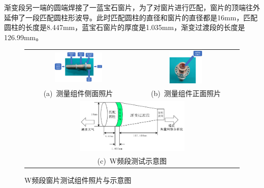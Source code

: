 \documentclass[master]{thesis-uestc}
\begin{document}
渐变段另一端的圆端焊接了一蓝宝石窗片，为了对窗片进行匹配，窗片的顶端往外延伸了一段匹配圆柱形波导。此时匹配圆柱的直径和窗片的直径都是16mm，匹配圆柱的长度是8.447mm，蓝宝石窗片的厚度是1.035mm，渐变过渡段的长度是126.99mm。
\begin{figure}[!htbp]
    \small
    \centering
    \begin{tabular}{@{\ }c@{\ }c}
        \includegraphics[width=0.47\textwidth]{pic/chapter5/测量喇叭侧面实拍.png} & 
        \hspace{5pt}
        \includegraphics[width=0.32\textwidth]{pic/chapter5/测量喇叭正面实拍.png}     \\
        \mbox{\small (a) 测量组件侧面照片}                                                                               & 
        \mbox{\small (b) 测量组件正面照片}                                                                                  \\[6bp]
        \multicolumn{2}{c}{\includegraphics[width=0.5\textwidth]{pic/chapter5/W频段测试示意图.png}} \\  %
        \multicolumn{2}{c}{\mbox{\small (c) W频段测试示意图}}
    \end{tabular}
    \caption{W频段窗片测试组件照片与示意图}
    \label{fig:W频段窗测试与示意图}
\end{figure}
\end{document}
